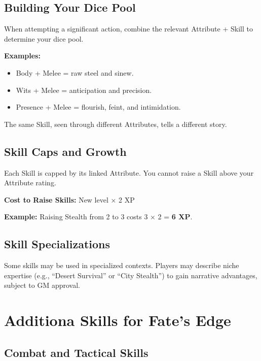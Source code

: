 \section{Building Your Dice Pool}

When attempting a significant action, combine the relevant Attribute + Skill to determine your dice pool.

\textbf{Examples:}
\begin{itemize}
  \item Body + Melee = raw steel and sinew.
  \item Wits + Melee = anticipation and precision.
  \item Presence + Melee = flourish, feint, and intimidation.
\end{itemize}

The same Skill, seen through different Attributes, tells a different story.

\section{Skill Caps and Growth}

Each Skill is capped by its linked Attribute. You cannot raise a Skill above your Attribute rating.

\textbf{Cost to Raise Skills:} New level × 2 XP

\textbf{Example:} Raising Stealth from 2 to 3 costs 3 × 2 = \textbf{6 XP}.

\section{Skill Specializations}

Some skills may be used in specialized contexts. Players may describe niche expertise (e.g., “Desert Survival” or “City Stealth”) to gain narrative advantages, subject to GM approval.

\chapter{Additiona Skills for Fate's Edge}

\section{Combat and Tactical Skills}

